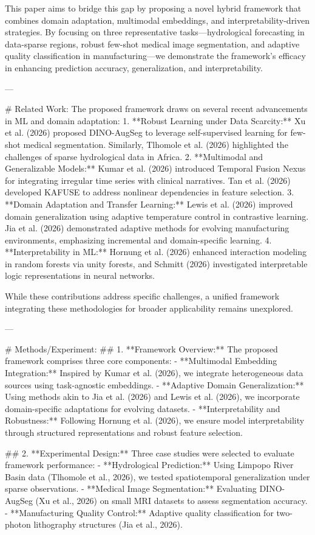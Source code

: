 This paper aims to bridge this gap by proposing a novel hybrid framework that combines domain adaptation, multimodal embeddings, and interpretability-driven strategies. By focusing on three representative tasks—hydrological forecasting in data-sparse regions, robust few-shot medical image segmentation, and adaptive quality classification in manufacturing—we demonstrate the framework's efficacy in enhancing prediction accuracy, generalization, and interpretability.

---

# Related Work:
The proposed framework draws on several recent advancements in ML and domain adaptation:
1. **Robust Learning under Data Scarcity:** Xu et al. (2026) proposed DINO-AugSeg to leverage self-supervised learning for few-shot medical segmentation. Similarly, Tlhomole et al. (2026) highlighted the challenges of sparse hydrological data in Africa.
2. **Multimodal and Generalizable Models:** Kumar et al. (2026) introduced Temporal Fusion Nexus for integrating irregular time series with clinical narratives. Tan et al. (2026) developed KAFUSE to address nonlinear dependencies in feature selection.
3. **Domain Adaptation and Transfer Learning:** Lewis et al. (2026) improved domain generalization using adaptive temperature control in contrastive learning. Jia et al. (2026) demonstrated adaptive methods for evolving manufacturing environments, emphasizing incremental and domain-specific learning.
4. **Interpretability in ML:** Hornung et al. (2026) enhanced interaction modeling in random forests via unity forests, and Schmitt (2026) investigated interpretable logic representations in neural networks.

While these contributions address specific challenges, a unified framework integrating these methodologies for broader applicability remains unexplored.

---

# Methods/Experiment:
## 1. **Framework Overview:**
The proposed framework comprises three core components:
   - **Multimodal Embedding Integration:** Inspired by Kumar et al. (2026), we integrate heterogeneous data sources using task-agnostic embeddings.
   - **Adaptive Domain Generalization:** Using methods akin to Jia et al. (2026) and Lewis et al. (2026), we incorporate domain-specific adaptations for evolving datasets.
   - **Interpretability and Robustness:** Following Hornung et al. (2026), we ensure model interpretability through structured representations and robust feature selection.

## 2. **Experimental Design:**
Three case studies were selected to evaluate framework performance:
   - **Hydrological Prediction:** Using Limpopo River Basin data (Tlhomole et al., 2026), we tested spatiotemporal generalization under sparse observations.
   - **Medical Image Segmentation:** Evaluating DINO-AugSeg (Xu et al., 2026) on small MRI datasets to assess segmentation accuracy.
   - **Manufacturing Quality Control:** Adaptive quality classification for two-photon lithography structures (Jia et al., 2026).

